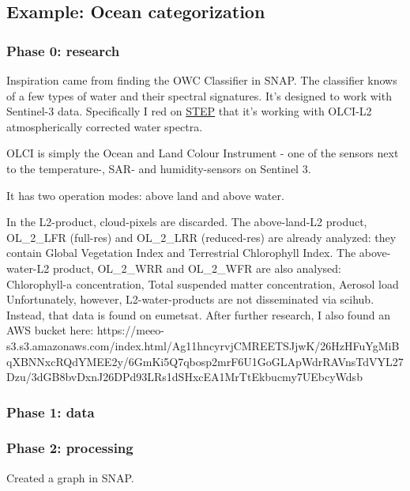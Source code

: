 \subsection{Example: Ocean categorization}

\subsubsection{Phase 0: research}
Inspiration came from finding the OWC Classifier in SNAP. The classifier knows of a few types of water and their spectral signatures.
It's designed to work with Sentinel-3 data.
Specifically I red on \href{https://forum.step.esa.int/t/owt-classification/11360}{STEP} that it's working with OLCI-L2 atmospherically corrected water spectra.

OLCI is simply the Ocean and Land Colour Instrument - one of the sensors next to the temperature-, SAR- and humidity-sensors on Sentinel 3.

It has two operation modes: above land and above water.

In the L2-product, cloud-pixels are discarded.
The above-land-L2 product, OL\_2\_LFR (full-res) and OL\_2\_LRR (reduced-res) are already analyzed: they contain Global Vegetation Index and Terrestrial Chlorophyll Index.
The above-water-L2 product, OL\_2\_WRR and OL\_2\_WFR are also analysed: Chlorophyll-a concentration, Total suspended matter concentration, Aerosol load
Unfortunately, however, L2-water-products are not disseminated via scihub. Instead, that data is found on eumetsat. After further research, I also found an AWS bucket here: https://meeo-s3.s3.amazonaws.com/index.html/Ag11hncyrvjCMREETSJjwK/26HzHFuYgMiBqXBNNxcRQdYMEE2y/6GmKi5Q7qbosp2mrF6U1GoGLApWdrRAVnsTdVYL27Dzu/3dGB8bvDxnJ26DPd93LRs1dSHxcEA1MrTtEkbucmy7UEbcyWdsb

\subsubsection{Phase 1: data}

\subsubsection{Phase 2: processing}
Created a graph in SNAP.


